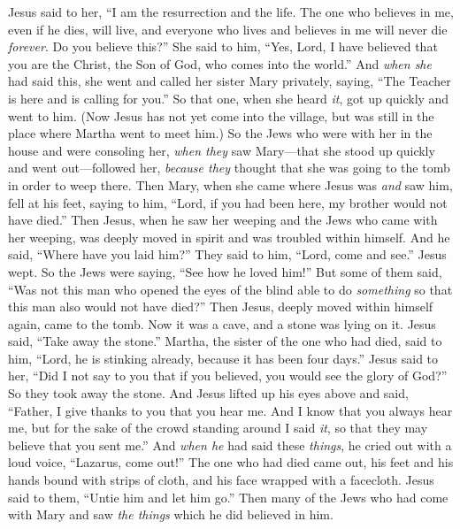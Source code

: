 \begin{biblechapter}
\verse Jesus said to her, “I am the resurrection and the life. The one who believes in me, even if he dies, will live,
\verse and everyone who lives and believes in me will never die \textit{forever}. Do you believe this?”
\verse She said to him, “Yes, Lord, I have believed that you are the Christ, the Son of God, who comes into the world.”
 And \textit{when she} had said this, she went and called her sister Mary privately, saying, “The Teacher is here and is calling for you.”
\verse So that one, when she heard \textit{it}, got up quickly and went to him.
\verse (Now Jesus has not yet come into the village, but was still in the place where Martha went to meet him.)
\verse So the Jews who were with her in the house and were consoling her, \textit{when they} saw Mary—that she stood up quickly and went out—followed her, \textit{because they} thought that she was going to the tomb in order to weep there.
\verse Then Mary, when she came where Jesus was \textit{and} saw him, fell at his feet, saying to him, “Lord, if you had been here, my brother would not have died.”
\verse Then Jesus, when he saw her weeping and the Jews who came with her weeping, was deeply moved in spirit and was troubled within himself.
\verse And he said, “Where have you laid him?” They said to him, “Lord, come and see.”
\verse Jesus wept.
\verse So the Jews were saying, “See how he loved him!”
\verse But some of them said, “Was not this man who opened the eyes of the blind able to do \textit{something} so that this man also would not have died?”
 Then Jesus, deeply moved within himself again, came to the tomb. Now it was a cave, and a stone was lying on it.
\verse Jesus said, “Take away the stone.” Martha, the sister of the one who had died, said to him, “Lord, he is stinking already, because it has been four days.”
\verse Jesus said to her, “Did I not say to you that if you believed, you would see the glory of God?”
\verse So they took away the stone. And Jesus lifted up his eyes above and said, “Father, I give thanks to you that you hear me.
\verse And I know that you always hear me, but for the sake of the crowd standing around I said \textit{it}, so that they may believe that you sent me.”
\verse And \textit{when he} had said these \textit{things}, he cried out with a loud voice, “Lazarus, come out!”
\verse The one who had died came out, his feet and his hands bound with strips of cloth, and his face wrapped with a facecloth. Jesus said to them, “Untie him and let him go.”
 Then many of the Jews who had come with Mary and saw \textit{the things} which he did believed in him.

\end{biblechapter}
